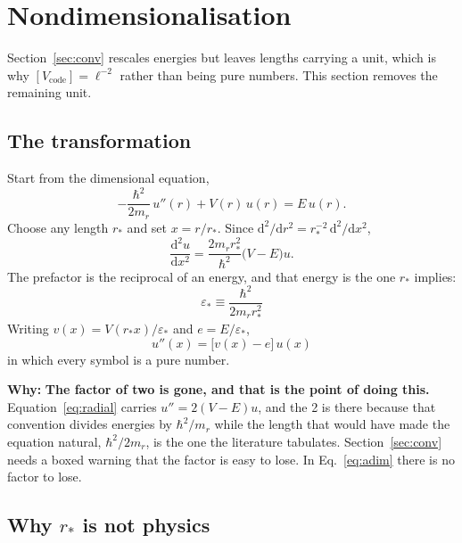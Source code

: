 \documentclass[11pt,a4paper]{article}
\newcommand{\why}[1]{\medskip\noindent\textbf{Why:} #1\medskip}
\begin{document}
\section{Nondimensionalisation}
\label{sec:adim}

Section~\ref{sec:conv} rescales energies but leaves lengths carrying a unit,
which is why $[V_{\mathrm{code}}] = \ell^{-2}$ rather than being pure numbers.
This section removes the remaining unit.

\subsection{The transformation}

Start from the dimensional equation,
\begin{equation}
  -\frac{\hbar^2}{2m_r}\,u''(r) + V(r)\,u(r) = E\,u(r).
\end{equation}
Choose any length $r_*$ and set $x = r/r_*$. Since
$\mathrm{d}^2/\mathrm{d}r^2 = r_*^{-2}\,\mathrm{d}^2/\mathrm{d}x^2$,
\begin{equation}
  \frac{\mathrm{d}^2u}{\mathrm{d}x^2}
  = \frac{2m_rr_*^2}{\hbar^2}\bigl(V-E\bigr)u .
\end{equation}
The prefactor is the reciprocal of an energy, and that energy is the one $r_*$
implies:
\begin{equation}
  \boxed{\;\varepsilon_* \equiv \frac{\hbar^2}{2m_rr_*^{2}}\;}
  \label{eq:epsstar}
\end{equation}
Writing $v(x) = V(r_*x)/\varepsilon_*$ and $e = E/\varepsilon_*$,
\begin{equation}
  \boxed{\;u''(x) = \bigl[v(x)-e\bigr]\,u(x)\;}
  \label{eq:adim}
\end{equation}
in which every symbol is a pure number.

\why{\textbf{The factor of two is gone, and that is the point of doing this.}
Equation~\eqref{eq:radial} carries $u'' = 2(V-E)u$, and the 2 is there because
that convention divides energies by $\hbar^2/m_r$ while the length that would
have made the equation natural, $\hbar^2/2m_r$, is the one the literature
tabulates. Section~\ref{sec:conv} needs a boxed warning that the factor is easy
to lose. In Eq.~\eqref{eq:adim} there is no factor to lose.}

\subsection{Why $r_*$ is not physics}
\end{document}
